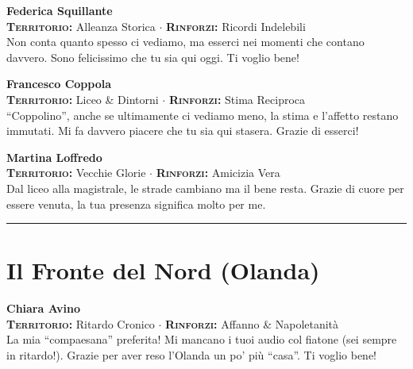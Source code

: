 \noindent\begin{minipage}{\linewidth}
\textbf{Federica Squillante} \\
{\footnotesize \textbf{\textsc{Territorio:}} Alleanza Storica $\cdot$ \textbf{\textsc{Rinforzi:}} Ricordi Indelebili} \\
Non conta quanto spesso ci vediamo, ma esserci nei momenti che contano davvero. Sono felicissimo che tu sia qui oggi. Ti voglio bene!
\end{minipage}
\vspace{0.6cm}

\noindent\begin{minipage}{\linewidth}
\textbf{Francesco Coppola} \\
{\footnotesize \textbf{\textsc{Territorio:}} Liceo \& Dintorni $\cdot$ \textbf{\textsc{Rinforzi:}} Stima Reciproca} \\
``Coppolino'', anche se ultimamente ci vediamo meno, la stima e l'affetto restano immutati. Mi fa davvero piacere che tu sia qui stasera. Grazie di esserci!
\end{minipage}
\vspace{0.6cm}

\noindent\begin{minipage}{\linewidth}
\textbf{Martina Loffredo} \\
{\footnotesize \textbf{\textsc{Territorio:}} Vecchie Glorie $\cdot$ \textbf{\textsc{Rinforzi:}} Amicizia Vera} \\
Dal liceo alla magistrale, le strade cambiano ma il bene resta. Grazie di cuore per essere venuta, la tua presenza significa molto per me.
\end{minipage}

\vspace{0.6cm}
\begin{center} \rule{0.5\linewidth}{0.5pt} \end{center}

\section*{Il Fronte del Nord (Olanda)}

\noindent\begin{minipage}{\linewidth}
\textbf{Chiara Avino} \\
{\footnotesize \textbf{\textsc{Territorio:}} Ritardo Cronico $\cdot$ \textbf{\textsc{Rinforzi:}} Affanno \& Napoletanità} \\
La mia ``compaesana'' preferita! Mi mancano i tuoi audio col fiatone (sei sempre in ritardo!). Grazie per aver reso l'Olanda un po' più ``casa''. Ti voglio bene!
\end{minipage}
\vspace{0.6cm}

